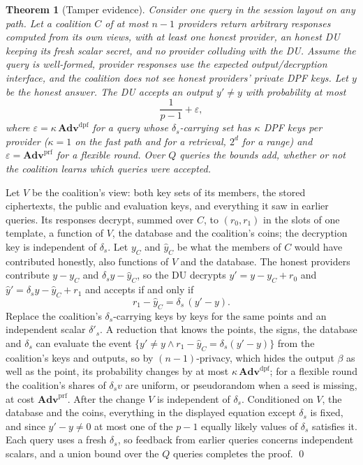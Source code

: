 \documentclass[a4paper,fleqn]{cas-sc}
\newtheorem{theorem}{Theorem}
\newcommand{\advPRF}{\mathbf{Adv}^{\mathrm{prf}}}
\newcommand{\advDPF}{\mathbf{Adv}^{\mathrm{dpf}}}
\begin{document}
\begin{theorem}[Tamper evidence]
\label{thm:tamper}
Consider one query in the session layout on any path. Let a coalition $C$ of at most $n-1$ providers return arbitrary
responses computed from its own views, with at least one honest provider,
an honest DU keeping its fresh scalar secret, and no provider colluding
with the DU. Assume the query is well-formed, provider responses use the
expected output/decryption interface, and the coalition does not see honest
providers' private DPF keys. Let $y$ be the honest answer. The DU accepts an output $y'\neq y$ with probability at most
\[
\frac{1}{p-1}+\varepsilon,
\]
where $\varepsilon=\kappa\,\advDPF$ for a query whose $\delta_s$-carrying set
has $\kappa$ DPF keys per provider ($\kappa=1$ on the fast path and for a
retrieval, $2^d$ for a range) and $\varepsilon=\advPRF$ for a flexible round. Over $Q$ queries the
bounds add, whether or not the coalition learns which queries were accepted.
\end{theorem}
\begin{pf}
Let $V$ be the coalition's view: both key sets of its members, the stored
ciphertexts, the public and evaluation keys, and everything it saw in earlier
queries. Its responses decrypt, summed over $C$, to $(r_0,r_1)$ in the slots of
one template, a function of $V$, the database and the coalition's coins; the
decryption key is independent of $\delta_s$. Let $y_C$ and $\hat y_C$ be what
the members of $C$ would have contributed honestly, also functions of $V$ and
the database. The honest providers contribute $y-y_C$ and
$\delta_sy-\hat y_C$, so the DU decrypts $y'=y-y_C+r_0$ and
$\hat y'=\delta_sy-\hat y_C+r_1$ and accepts if and only if
\[
r_1-\hat y_C=\delta_s\,(y'-y).
\]
Replace the coalition's $\delta_s$-carrying keys by keys for the same points
and an independent scalar $\delta'_s$. A reduction that knows the points, the
signs, the database and $\delta_s$ can evaluate the event
$\{y'\neq y\wedge r_1-\hat y_C=\delta_s(y'-y)\}$ from the coalition's keys and
outputs, so by $(n{-}1)$-privacy, which hides the output $\beta$ as well as the
point, its probability changes by at most $\kappa\,\advDPF$; for a flexible
round the coalition's shares of $\delta_sv$ are uniform, or pseudorandom when a
seed is missing, at cost $\advPRF$. After the change $V$ is independent of
$\delta_s$. Conditioned on $V$, the database and the coins, everything in the
displayed equation except $\delta_s$ is fixed, and since $y'-y\neq0$ at most one
of the $p-1$ equally likely values of $\delta_s$ satisfies it. Each query uses
a fresh $\delta_s$, so feedback from earlier queries concerns independent
scalars, and a union bound over the $Q$ queries completes the proof. \qed
\end{pf}
\end{document}
